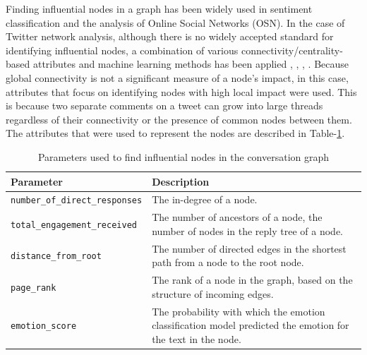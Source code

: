 \documentclass[acmtog]{acmart}
\begin{document}
Finding influential nodes in a graph has been widely used in sentiment classification and the analysis of Online Social Networks (OSN). In the case of Twitter network analysis, although there is no widely accepted standard for identifying influential nodes, a combination of various connectivity/centrality-based attributes and machine learning methods has been applied \cite{berahmand2020new}, \cite{vilarinho2018global}, \cite{ban2021lexical}, \cite{bordoloi2020graph}. Because global connectivity is not a significant measure of a node's impact, in this case, attributes that focus on identifying nodes with high local impact were used. This is because two separate comments on a tweet can grow into large threads regardless of their connectivity or the presence of common nodes between them. The attributes that were used to represent the nodes are described in Table-\ref{tab:params_rule}.

\begin{table}[]
\centering
\caption{Parameters used to find influential nodes in the conversation graph}
\label{tab:params_rule}
\begin{tabular}{|p{4cm}|p{4.2cm}|}
\hline
Parameter                                         & Description                                                                                                                          \\ \hline
\texttt{number\_of\_direct\_responses}              & The in-degree of a node.                                                             \\
\texttt{total\_engagement\_received}        & The number of ancestors of a node, the number of nodes in the reply tree of a node.                                                             \\
\texttt{distance\_from\_root}             & The number of directed edges in the shortest path from a node to the root node.                                                                   \\
\texttt{page\_rank}                      & The rank of a node in the graph, based on the structure of incoming edges.                                                                      \\
\texttt{emotion\_score}                 & The probability with which the emotion classification model predicted the emotion for the text in the node.                              
                                                                         \\ \hline
\end{tabular}
\end{table}
\end{document}
